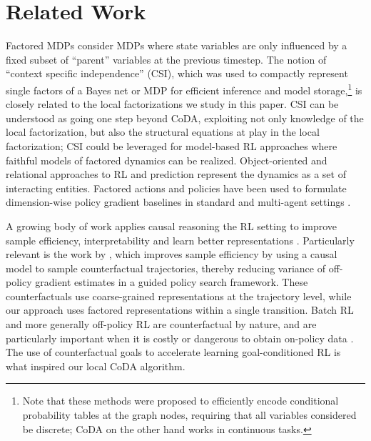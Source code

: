 \documentclass{article}
\begin{document}
\section{Related Work}\label{section_related_work}

Factored MDPs \cite{guestrin2003efficient,hallak2015off,weber2019credit} consider MDPs where state variables are only influenced by a fixed subset of ``parent'' variables at the previous timestep.
The notion of ``context specific independence'' (CSI), which was used to compactly represent single factors of a Bayes net \citep{boutilier2013context} or MDP \citep{boutilier1995exploiting} for efficient inference and model storage,\footnote{Note that these methods were proposed to efficiently encode conditional probability tables at the graph nodes, requiring that all variables considered be discrete; CoDA on the other hand works in continuous tasks.} is closely related to the local factorizations we study in this paper.
CSI can be understood as going one step beyond CoDA, exploiting not only knowledge of the local factorization, but also the structural equations at play in the local factorization; CSI could be leveraged for model-based RL approaches where faithful models of factored dynamics can be realized.
Object-oriented and relational approaches to RL and prediction \cite{diuk2008object,goyal2019recurrent,kipf2019contrastive,li2019towards,zambaldi2018relational,zhu2018object} represent the dynamics as a set of interacting entities. Factored actions and policies have been used to formulate dimension-wise policy gradient baselines in standard and multi-agent settings \cite{foerster2018counterfactual, lowe2017multi,wu2018variance}. 

A growing body of work applies causal reasoning the RL setting to improve sample efficiency, interpretability and learn better representations \cite{lu2018deconfounding,madumal2019explainable,rezende2020causally}. Particularly relevant is the work by \citet{buesing2018woulda}, which improves sample efficiency by using a causal model to sample counterfactual trajectories, thereby reducing variance of off-policy gradient estimates in a guided policy search framework. 
These counterfactuals use coarse-grained representations at the trajectory level, while our approach uses factored representations within a single transition.
Batch RL \cite{levine2020offline,fujimoto2018off,mandel2014offline} and  more generally off-policy RL \cite{watkins1992q,munos2016safe} are counterfactual by nature, and are particularly important when it is costly or dangerous to obtain on-policy data \cite{thomas2016data}. The use of counterfactual goals to accelerate learning goal-conditioned RL \cite{kaelbling1993learning,schaul2015universal,plappert2018multi} is what inspired our local CoDA algorithm.
\end{document}
